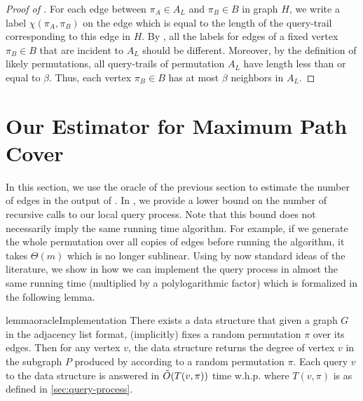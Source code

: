 \begin{proof}[Proof of ]
For each edge between $\pi_A \in A_L$ and $\pi_B \in B$ in graph $H$, we write a label $\chi(\pi_A, \pi_B)$ on the edge which is equal to the length of the query-trail corresponding to this edge in $H$. By , all the labels for edges of a fixed vertex $\pi_B \in B$ that are incident to $A_L$ should be different. Moreover, by the definition of likely permutations, all query-trails of permutation $A_L$ have length less than or equal to $\beta$. Thus, each vertex $\pi_B \in B$ has at most $\beta$ neighbors in $A_L$.
\end{proof}










\section{Our Estimator for Maximum Path Cover}\label{sec: disjoint-paths-estimate}
In this section, we use the oracle of the previous section to estimate the number of edges in the output of \algtwo{}. In , we provide a lower bound on the number of recursive calls to our local query process. Note that this bound does not necessarily imply the same running time algorithm. For example, if we generate the whole permutation over all copies of edges before running the algorithm, it takes $\Theta(m)$ which is no longer sublinear. Using by now standard ideas of the literature, we show in  how we can implement the query process in almost the same running time (multiplied by a polylogarithmic factor) which is formalized in the following lemma.



\begin{restatable}{lemma}{oracleImplementation}\label{lem: implementation}
There exists a data structure that given a graph $G$ in the adjacency list format, (implicitly) fixes a random permutation $\pi$ over its edges. Then for any vertex $v$, the data structure returns the degree of vertex $v$ in the subgraph $P$ produced by \algtwo{} according to a random permutation $\pi$. Each query $v$ to the data structure is answered in $\Tilde{O}(T(v, \pi))$ time w.h.p. where $T(v, \pi)$ is as defined in \cref{sec:query-process}.
\end{restatable}


